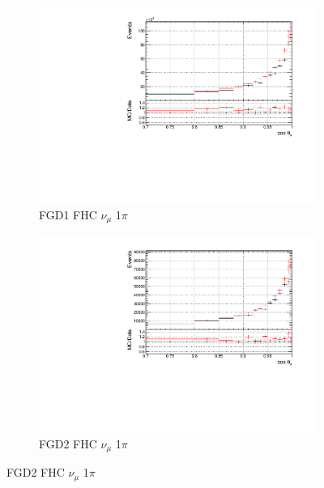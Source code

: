 \begin{figure}[!h]
\begin{subfigure}{0.49\textwidth}
  \centering
  \includegraphics[width=\textwidth]{figs/prioronly1D_t_FGD1_numuCC_1pi}
  \caption{FGD1 FHC $\nu_{\mu}$ 1$\pi$}
\end{subfigure}
\begin{subfigure}{0.49\textwidth}
  \centering
  \includegraphics[width=\textwidth]{figs/prioronly1D_t_FGD2_numuCC_1pi}
  \caption{FGD2 FHC $\nu_{\mu}$ 1$\pi$}
\end{subfigure}


\end{figure}

